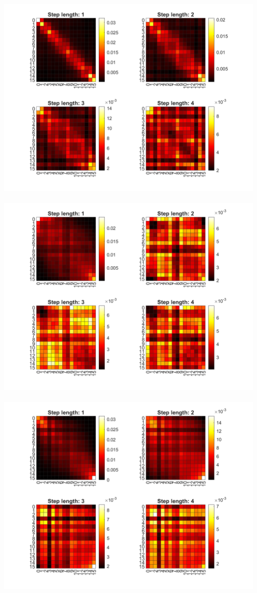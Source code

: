 \documentclass[12pt, letterpaper, twoside]{article}
\begin{document}
\ \\
\includegraphics[scale=0.4]{"glcm6.png"}
\ \\
\includegraphics[scale=0.4]{"glcm7.png"}
\ \\
\includegraphics[scale=0.4]{"glcm8.png"}
\ \\
\end{document}
